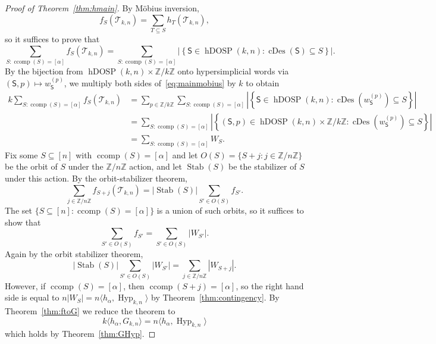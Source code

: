\documentclass[12pt,reqno]{amsart}
\theoremstyle{plain}
\theoremstyle{definition}
\newcommand{\Z}{\mathbb{Z}}
\newcommand{\Tri}{\mathcal{T}_{k,n}}
\newcommand{\dosp}{\mathsf{S}}
\DeclareMathOperator{\ccomp}{ccomp}
\DeclareMathOperator{\Hyp}{Hyp}
\DeclareMathOperator{\Stab}{Stab}
\DeclareMathOperator{\cDes}{cDes}
\DeclareMathOperator{\hDOSP}{hDOSP}
\begin{document}
\begin{proof}[Proof of Theorem~\ref{thm:hmain}]
	By M\"obius inversion,
	\[
		f_S(\Tri) = \sum_{T \subseteq S} h_T(\Tri),
	\]
	so it suffices to prove that
	\begin{equation}\label{eq:mainmobius}
		\sum_{S: \ccomp(S) = [\alpha]} f_S(\Tri) = \sum_{S: \ccomp(S) = [\alpha]} \left| \left\{ \dosp \in \hDOSP(k,n): \cDes(\dosp) \subseteq S \right\} \right|.
	\end{equation}
	By the bijection from $\hDOSP(k,n) \times \Z/k\Z $ onto hypersimplicial words via $(\dosp, p)\mapsto w_\dosp^{(p)}$,
	we multiply both sides of~\eqref{eq:mainmobius} by $k$ to obtain
	\begin{equation}
		\begin{aligned}
			k\sum_{S: \ccomp(S) = [\alpha]} f_S(\Tri) & = \sum_{p \in \Z/k\Z}\sum_{S: \ccomp(S) = [\alpha]} \left| \left\{ \dosp \in \hDOSP(k,n): \cDes(w_\dosp^{(p)}) \subseteq S \right\} \right| \\
			                                          & = \sum_{S: \ccomp(S) = [\alpha]} \left| \left\{ (\dosp,p) \in \hDOSP(k,n) \times \Z/k\Z: \cDes(w_\dosp^{(p)}) \subseteq S \right\} \right| \\
			                                          & = \sum_{S: \ccomp(S) = [\alpha]} W_S.
		\end{aligned}
	\end{equation}
	Fix some $S \subseteq [n]$ with $\ccomp(S) = [\alpha]$ and let $O(S) = \{S+j: j \in \Z/n\Z\}$ be the orbit of $S$ under the $\Z/n\Z$ action, and let $\Stab(S)$ be the stabilizer of $S$ under this action.
	By the orbit-stabilizer theorem,
	\[
		\sum_{j \in \Z/n\Z} f_{S+j}(\Tri) = |\Stab(S)| \sum_{S' \in O(S)} f_{S'}.
	\]
	The set $\{S \subseteq [n]: \ccomp(S) = [\alpha]\}$ is a union of such orbits, so it suffices to show that
	\[
		\sum_{S' \in O(S)} f_{S'} = \sum_{S' \in O(S)} |W_{S'}|.
	\]
	Again by the orbit stabilizer theorem,
	\[
		|\Stab(S)| \sum_{S' \in O(S)} |W_{S'}| = \sum_{j \in \Z/n\Z} |W_{S+j}|.
	\]
	However, if $\ccomp(S) = [\alpha]$, then $\ccomp(S+j) = [\alpha]$, so the right hand side is equal to $n |W_S| = n
	\langle h_\alpha, \Hyp_{k,n}\rangle$ by Theorem~\ref{thm:contingency}. By Theorem~\ref{thm:ftoG} we reduce the theorem to
	\[
		k \langle h_\alpha, G_{k,n} \rangle = n \langle h_\alpha, \Hyp_{k,n} \rangle
	\]
	which holds by Theorem~\ref{thm:GHyp}.
\end{proof}

 
\end{document}
